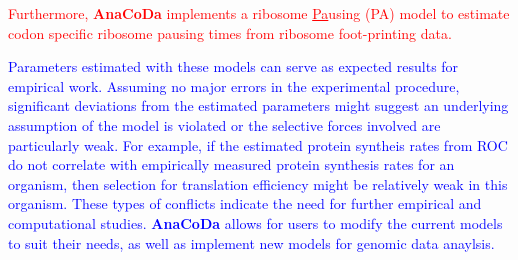 \documentclass{bioinfo}
\newcommand{\package}{\textbf{AnaCoDa }} %
\begin{document}
\textcolor{red}{
Furthermore, \package implements a ribosome \underline{Pa}using (PA) model to estimate codon specific ribosome pausing times from ribosome foot-printing data.
}

\textcolor{blue}{
Parameters estimated with these models can serve as expected results for empirical work. 
Assuming no major errors in the experimental procedure, significant deviations from the estimated parameters might suggest an underlying assumption of the model is violated or the selective forces involved are particularly weak.
For example, if the estimated protein syntheis rates from ROC do not correlate with empirically measured protein synthesis rates for an organism, then selection for translation efficiency might be relatively weak in this organism.
These types of conflicts indicate the need for further empirical and computational studies.
\package allows for users to modify the current models to suit their needs, as well as implement new models for genomic data anaylsis.   
}



\end{document}
